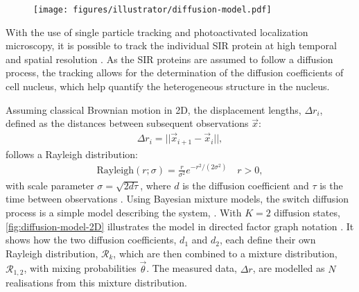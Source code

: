 \begin{figure}[htbp]
    \centering
    \texttt{[image: figures/illustrator/diffusion-model.pdf]}
\end{figure}

With the use of single particle tracking and photoactivated localization microscopy, it is possible to track the individual SIR protein at high temporal and spatial resolution \autocite{oswaldImagingQuantificationTransmembrane2014,manleyHighdensityMappingSinglemolecule2008}. As the SIR proteins are assumed to follow a diffusion process, the tracking allows for the determination of the diffusion coefficients of cell nucleus, which help quantify the heterogeneous structure in the nucleus.

Assuming classical Brownian motion in 2D, the displacement lengths, $\Delta r_i$, defined as the distances between subsequent observations $\vec{x}$:
\begin{align}
    \Delta r_i = || \vec{x}_{i+1} - \vec{x}_{i} ||,
\end{align}
follows a Rayleigh distribution:
\begin{align}
    \mathrm{Rayleigh}(r; \sigma) =\frac{r}{\sigma^2} e^{-r^2/(2\sigma^2)} \quad r>0,
\end{align}
with scale parameter $\sigma = \sqrt{2d\tau}$, where $d$ is the diffusion coefficient and $\tau$ is the time between observations \autocite{andersonTrackingCellSurface1992}
. Using Bayesian mixture models, the switch diffusion process is a simple model describing the system, \autocite{bakerInferenceDiffusionCoefficients2021}. With $K=2$ diffusion states, \autoref{fig:diffusion-model-2D} illustrates the model in directed factor graph notation \autocite{dietzDirectedFactorGraph2022}. It shows how the two diffusion coefficients, $d_1$ and $d_2$, each define their own Rayleigh distribution, $\mathcal{R}_k$, which are then combined to a mixture distribution, $\mathcal{R}_{1,2}$, with mixing probabilities $\vec{\theta}$. The measured data, $\Delta r$, are modelled as $N$ realisations from this mixture distribution.


